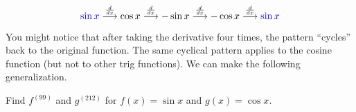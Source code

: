 \documentclass[12pt]{article}
\begin{document}
$$ {\color{blue}\sin x} \stackrel{\frac{d}{dx}}{\longrightarrow} \cos x \stackrel{\frac{d}{dx}}{\longrightarrow} -\sin x \stackrel{\frac{d}{dx}}{\longrightarrow} -\cos x \stackrel{\frac{d}{dx}}{\longrightarrow} {\color{blue}\sin x} $$

\vspace{3mm}

You might notice that after taking the derivative four times, the pattern ``cycles'' back to the original function. The same cyclical pattern applies to the cosine function (but not to other trig functions). We can make the following generalization.

\vspace{3mm}


\vspace{3mm}

\Example Find $f^{(99)}$ and $g^{(212)}$ for $f(x)=\sin x$ and $g(x)=\cos x$. 
\end{document}

